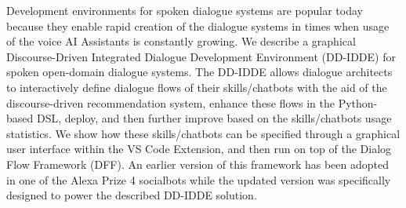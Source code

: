 Development environments for spoken dialogue systems are popular today because they enable rapid creation of the dialogue systems in times when usage of the voice AI Assistants is constantly growing. We describe a graphical Discourse-Driven Integrated Dialogue Development Environment (DD-IDDE) for spoken open-domain dialogue systems. The DD-IDDE allows dialogue architects to interactively define dialogue flows of their skills/chatbots with the aid of the discourse-driven recommendation system, enhance these flows in the Python-based DSL, deploy, and then further improve based on the skills/chatbots usage statistics. We show how these skills/chatbots can be specified through a graphical user interface within the VS Code Extension, and then run on top of the Dialog Flow Framework (DFF). An earlier version of this framework has been adopted in one of the Alexa Prize 4 socialbots while the updated version was specifically designed to power the described DD-IDDE solution.
